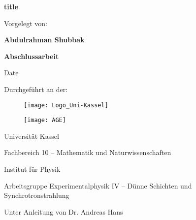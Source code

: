 \pagestyle{empty}
\clearpage

\vspace*{2ex}

\noindent\makebox[\textwidth]{\rule{\textwidth}{0.4pt}}%
\noindent
{\huge
\begin{center}
\textbf{title}
\end{center}
}

\noindent\makebox[\textwidth]{\rule{\textwidth}{0.4pt}}

\begin{center}

\vspace{3pt}
{
\large
Vorgelegt von:

\textbf{Abdulrahman  Shubbak}

}

\vspace{93pt}

{
\Large
\textbf{Abschlussarbeit}

}
\vspace{10pt}
Date

\end{center}

\vspace{10pt}
\begin{center}
{\large
Durchgeführt an der:
}
\vspace{0pt}
\begin{figure}[ht]
\begin{minipage}{0.6\textwidth}
\centering
\texttt{[image: Logo\_Uni-Kassel]}
\end{minipage}
\begin{minipage}{0.4\textwidth}
\flushleft
\texttt{[image: AGE]}
\end{minipage}
\end{figure}

\vspace{0pt}
{\large
Universität Kassel

\vspace{10pt}
Fachbereich 10 -- Mathematik und Naturwissenschaften

\vspace{10pt}
Institut für Physik
\vspace{10pt}

Arbeitsgruppe Experimentalphysik IV -- Dünne Schichten und Synchrotronstrahlung 

\vspace{20pt}
Unter Anleitung von Dr.  Andreas Hans

}
\end{center}

\normalsize
\restoregeometry
\cleardoublepage
\thispagestyle{empty}
{\hypersetup{linkcolor=black}
\tableofcontents
}



